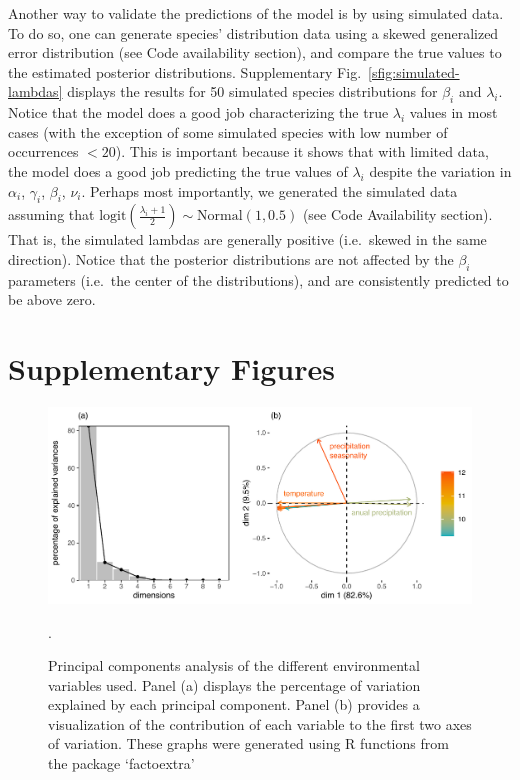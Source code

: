 \documentclass[11pt, a4paper]{article}
\begin{document}
Another way to validate the predictions of the model is by using simulated data. To do so, one can generate species' distribution data using a skewed generalized error distribution (see Code availability section), and compare the true values to the estimated posterior distributions. Supplementary Fig.~\ref{sfig:simulated-lambdas} displays the results for 50 simulated species distributions for $\beta_i$ and $\lambda_i$. Notice that the model does a good job characterizing the true $\lambda_i$ values in most cases (with the exception of some simulated species with low number of occurrences $<20$). This is important because it shows that with limited data, the model does a good job predicting the true values of $\lambda_i$ despite the variation in $\alpha_i$, $\gamma_i$, $\beta_i$, $\nu_i$. Perhaps most importantly, we generated the simulated data assuming that $\text{logit}\left(\frac{\lambda_i+1}{2}\right)\sim\text{Normal}(1, 0.5)$ (see Code Availability section). That is, the simulated lambdas are generally positive (i.e.~skewed in the same direction).  Notice that the posterior distributions are not affected by the $\beta_i$ parameters (i.e.~the center of the distributions), and are consistently predicted to be above zero.


\section*{Supplementary Figures}

\begin{figure}[ht]
  \centering
    \vspace{0.5cm}
    \includegraphics[width=1\textwidth]{figures/variances}
    	  \vspace{0.3cm}
	   \caption{Principal components analysis of the different environmental variables used. Panel (a) displays the percentage of variation explained by each principal component. Panel (b) provides a visualization of the contribution of each variable to the first two axes of variation. These graphs were generated using R functions from the package `factoextra' \citep{kassambaraFactoextraExtractVisualize2017}}.
      \label{sfig:pca}
\end{figure}
\end{document}
